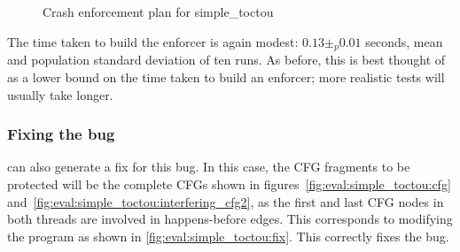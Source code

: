 \begin{figure}
  \caption{Crash enforcement plan for simple\_toctou}
  \label{fig:eval:simple_toctou:enforce_plan}
\end{figure}

The time taken to build the enforcer is again modest: $0.13 \pm_p
0.01$ seconds, mean and population standard deviation of ten runs.  As
before, this is best thought of as a lower bound on the time taken to
build an enforcer; more realistic tests will usually take longer.

\subsubsection{Fixing the bug}
{\Implementation} can also generate a fix for this bug.  In this case,
the CFG fragments to be protected will be the complete CFGs shown in
figures~\ref{fig:eval:simple_toctou:cfg}
and~\ref{fig:eval:simple_toctou:interfering_cfg2}, as the first and
last CFG nodes in both threads are involved in happens-before edges.
This corresponds to modifying the program as shown in
\autoref{fig:eval:simple_toctou:fix}.  This correctly fixes the
bug.

